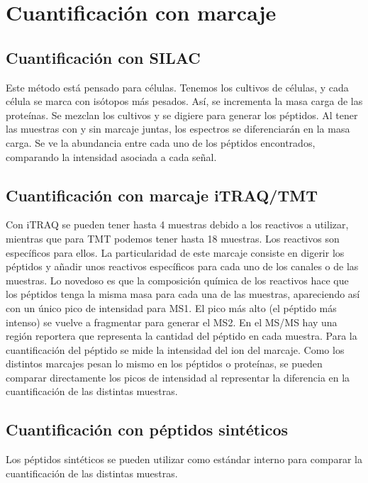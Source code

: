\section{Cuantificación con marcaje}
\subsection{Cuantificación con SILAC}
Este método está pensado para células. Tenemos los cultivos de células, y cada célula se marca con isótopos más pesados. Así, se incrementa la masa carga de las proteínas. Se mezclan los cultivos y se digiere para generar los péptidos. Al tener las muestras con y sin marcaje juntas, los espectros se diferenciarán en la masa carga. Se ve la abundancia entre cada uno de los péptidos encontrados, comparando la intensidad asociada a cada señal. 

\subsection{Cuantificación con marcaje iTRAQ/TMT}
Con iTRAQ se pueden tener hasta 4 muestras debido a los reactivos a utilizar, mientras que para TMT podemos tener hasta 18 muestras. Los reactivos son específicos para ellos. La particularidad de este marcaje consiste en digerir los péptidos y añadir unos reactivos específicos para cada uno de los canales o de las muestras. Lo novedoso es que la composición química de los reactivos hace que los péptidos tenga la misma masa para cada una de las muestras, apareciendo así con un único pico de intensidad para MS1. El pico más alto (el péptido más intenso) se vuelve a fragmentar para generar el MS2. En el MS/MS hay una región reportera que representa la cantidad del péptido en cada muestra. Para la cuantificación del péptido se mide la intensidad del ion del marcaje. Como los distintos marcajes pesan lo mismo en los péptidos o proteínas, se pueden comparar directamente los picos de intensidad al representar la diferencia en la cuantificación de las distintas muestras. 

\subsection{Cuantificación con péptidos sintéticos}
Los péptidos sintéticos se pueden utilizar como estándar interno para comparar la cuantificación de las distintas muestras. 

